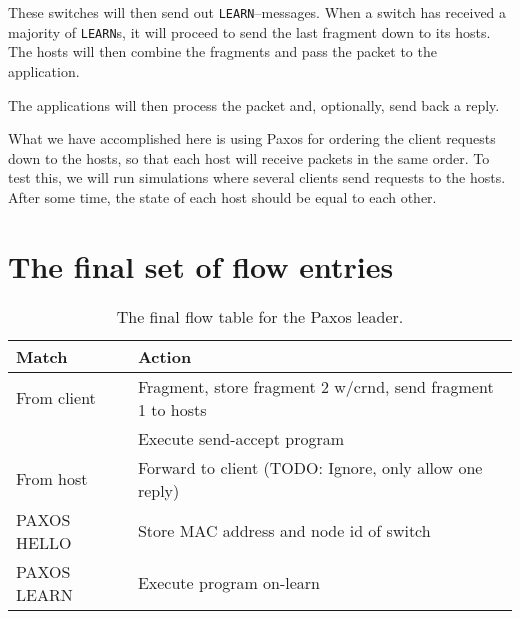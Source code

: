 These switches will then send out \texttt{LEARN}--messages.
When a switch has received a majority of \texttt{LEARN}s, it will proceed to
send the last fragment down to its hosts.  The hosts will then combine the
fragments and pass the packet to the application.

The applications will then process the packet and, optionally, send back a
reply.


What we have accomplished here is using Paxos for ordering the client
requests down to the hosts, so that each host will receive packets in the
same order.  To test this, we will run simulations where several clients
send requests to the hosts. After some time, the state of each host should
be equal to each other.

\section{The final set of flow entries}



\begin{table}[H]
  \begin{tabular}{|l|l|}
    \hline \textbf{Match} & \textbf{Action} \\
    \hline From client & Fragment, store fragment 2 w/crnd, send fragment 1 to hosts \\
                       & Execute send-accept program \\
    \hline From host & Forward to client (TODO: Ignore, only allow one reply) \\
    \hline PAXOS HELLO & Store MAC address and node id of switch \\
    \hline PAXOS LEARN & Execute program on-learn \\
    \hline
  \end{tabular}
  \caption{The final flow table for the Paxos leader.}
  \label{table:complete.match.leader}
\end{table}


